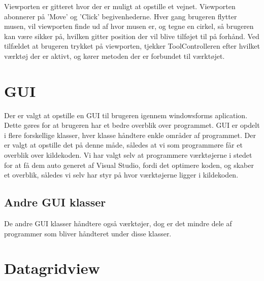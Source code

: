 \vspace{5mm}

Viewporten er gitteret hvor der er muligt at opstille et vejnet. Viewporten abonnerer på 'Move' og 'Click' begivenhederne. Hver gang brugeren flytter musen, vil viewporten finde ud af hvor musen er, og tegne en cirkel, så brugeren kan være sikker på, hvilken gitter position der vil blive tilføjet til på forhånd. Ved tilfældet at brugeren trykket på viewporten, tjekker ToolControlleren efter hvilket værktøj der er aktivt, og kører metoden der er forbundet til værktøjet.

\vspace{5mm}

\section{GUI}
Der er valgt at opstille en GUI til brugeren igennem windowsforms aplication. Dette gøres for at brugeren har et bedre overblik over programmet. GUI er opdelt i flere forskellige klasser, hver klasse håndtere enkle områder af programmet. Der er valgt at opstille det på denne måde, således at vi som programmøre får et overblik over kildekoden. Vi har valgt selv at programmere værktøjerne i stedet for at få dem auto generet af Visual Studio, fordi det optimere koden, og skaber et overblik, således vi selv har styr på hvor værktøjerne ligger i kildekoden.

\subsection{Andre GUI klasser}
De andre GUI klasser håndtere også værktøjer, dog er det mindre dele af programmer som bliver håndteret under disse klasser. 

\section{Datagridview}


\begin {lstlisting}
\end {lstlisting}
